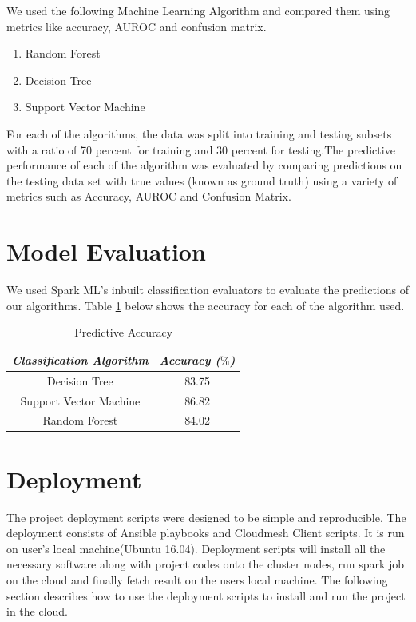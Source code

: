 \documentclass[9pt,twocolumn,twoside]{../../styles/osajnl}
\begin{document}
	We used the following Machine Learning Algorithm and compared them using metrics like accuracy, AUROC and confusion matrix.
		\begin{enumerate}
		\item {Random Forest}
		\item {Decision Tree}  
		\item {Support Vector Machine} 
		\end{enumerate}

	For each of the algorithms, the data was split into training and testing subsets with a ratio of 70 percent for training and 30 percent for testing.The predictive performance of each of the algorithm was evaluated by comparing predictions on the testing data set with true values (known as ground truth) using a variety of metrics such as Accuracy, AUROC and Confusion Matrix.

\section{Model Evaluation}
	We used Spark ML's inbuilt classification evaluators to evaluate the predictions of our algorithms. Table \ref{table:ML} below shows the accuracy for each of the algorithm used.

		\begin{table}[h!]
		\centering
		\begin{tabular}{|c c |} 
		\hline
		\textit{Classification Algorithm} & \textit{Accuracy ($\%$)}\\ 
		\hline
		\hline 
		Decision Tree  &  83.75\\
		\hline  
		Support Vector Machine & 86.82\\
		\hline 
		Random Forest & 84.02\\
		\hline
		\end{tabular}
		\caption{Predictive Accuracy}
		\label{table:ML}
		\end{table}


\section{Deployment}
	The project deployment scripts were designed to be simple and reproducible. The deployment consists of Ansible playbooks and Cloudmesh Client scripts. It is run on user's local machine(Ubuntu 16.04). Deployment scripts will install all the necessary software along with project codes onto the cluster nodes, run spark job on the cloud and finally fetch result on the users local machine. The following section describes how to use the deployment scripts to install and run the project in the cloud.
	
\end{document}
